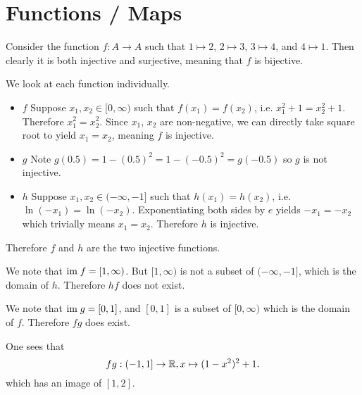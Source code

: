 \section{Functions / Maps}
\begin{questions}
    \item Consider the function $f: A \to A$ such that $1 \mapsto 2$, $2 \mapsto 3$, $3 \mapsto 4$, and $4 \mapsto 1$. Then clearly it is both injective and surjective, meaning that $f$ is bijective.
    
    \item \begin{partquestions}{\alph*}
        \item We look at each function individually.
        \begin{itemize}
            \item $\boxed{f}$ Suppose $x_1,x_2 \in [0,\infty)$ such that $f(x_1) = f(x_2)$, i.e. $x_1^2 + 1 = x_2^2 + 1$. Therefore $x_1^2 = x_2^2$. Since $x_1$, $x_2$ are non-negative, we can directly take square root to yield $x_1 = x_2$, meaning $f$ is injective.
            \item $\boxed{g}$ Note $g(0.5) = 1-(0.5)^2 = 1 - (-0.5)^2 = g(-0.5)$ so $g$ is not injective.
            \item $\boxed{h}$ Suppose $x_1,x_2 \in (-\infty, -1]$ such that $h(x_1) = h(x_2)$, i.e. $\ln(-x_1) = \ln(-x_2)$. Exponentiating both sides by $e$ yields $-x_1 = -x_2$ which trivially means $x_1 = x_2$. Therefore $h$ is injective.
        \end{itemize}
        Therefore $f$ and $h$ are the two injective functions.

        \item We note that $\mathrm{im}\; f = [1, \infty)$. But $[1, \infty)$ is not a subset of $(-\infty, -1]$, which is the domain of $h$. Therefore $hf$ does not exist.
        
        \item We note that $\mathrm{im}\; g = [0, 1]$, and $[0, 1]$ is a subset of $[0, \infty)$ which is the domain of $f$. Therefore $fg$ does exist.
        
        One sees that
        \[
            fg: (-1, 1] \to \mathbb{R}, x \mapsto (1-x^2)^2 + 1.
        \]
        which has an image of $[1, 2]$.
    \end{partquestions}
    

\end{questions}
